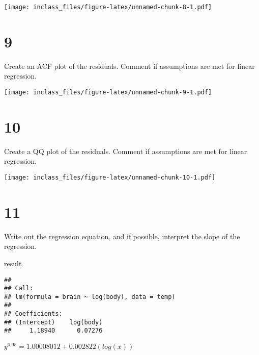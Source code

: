\documentclass[]{article}
\newenvironment{Shaded}{\begin{snugshade}}{\end{snugshade}}
\newcommand{\KeywordTok}[1]{\textcolor[rgb]{0.13,0.29,0.53}{\textbf{#1}}}
\newcommand{\DataTypeTok}[1]{\textcolor[rgb]{0.13,0.29,0.53}{#1}}
\newcommand{\StringTok}[1]{\textcolor[rgb]{0.31,0.60,0.02}{#1}}
\newcommand{\OperatorTok}[1]{\textcolor[rgb]{0.81,0.36,0.00}{\textbf{#1}}}
\newcommand{\NormalTok}[1]{#1}
\begin{document}
\texttt{[image: inclass\_files/figure-latex/unnamed-chunk-8-1.pdf]}

\section{9}\label{section-6}

Create an ACF plot of the residuals. Comment if assumptions are met for
linear regression.

\begin{Shaded}
\end{Shaded}

\texttt{[image: inclass\_files/figure-latex/unnamed-chunk-9-1.pdf]}

\section{10}\label{section-7}

Create a QQ plot of the residuals. Comment if assumptions are met for
linear regression.

\begin{Shaded}
\end{Shaded}

\texttt{[image: inclass\_files/figure-latex/unnamed-chunk-10-1.pdf]}

\section{11}\label{section-8}

Write out the regression equation, and if possible, interpret the slope
of the regression.

\begin{Shaded}
\begin{Highlighting}[]
\NormalTok{result}
\end{Highlighting}
\end{Shaded}

\begin{verbatim}
## 
## Call:
## lm(formula = brain ~ log(body), data = temp)
## 
## Coefficients:
## (Intercept)    log(body)  
##     1.18940      0.07276
\end{verbatim}

\(y^{0.05} = 1.00008012 + 0.002822(log(x))\)
\end{document}

